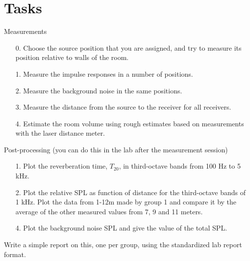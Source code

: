 \documentclass{article}
\begin{document}
\section{Tasks}
Measurements
\begin{itemize}
    \item[0. ] Choose the source position that you are assigned, and try to measure its position relative to walls of the room.
    \item [1.] Measure the impulse responses in a number of positions.
    \item [2.] Measure the background noise in the same positions.
    \item [3.] Measure the distance from the source to the receiver for all receivers.
    \item [4.] Estimate the room volume using rough estimates based on measurements with the laser distance meter.
\end{itemize}
Post-processing (you can do this in the lab after the measurement session)
\begin{itemize}
    \item [1.] Plot the reverberation time, $T_{20}$, in third-octave bands from 100 Hz to 5 kHz.
    \item [2.] Plot the relative SPL as function of distance for the third-octave bands of 1 kHz. Plot the data from 1-12m made by group 1 and compare it by the average of the other measured values from 7, 9 and 11 meters.
    \item [4.] Plot the background noise SPL and give the value of the total SPL. 
\end{itemize}

Write a simple report on this, one per group, using the standardized lab report format.
\end{document}
